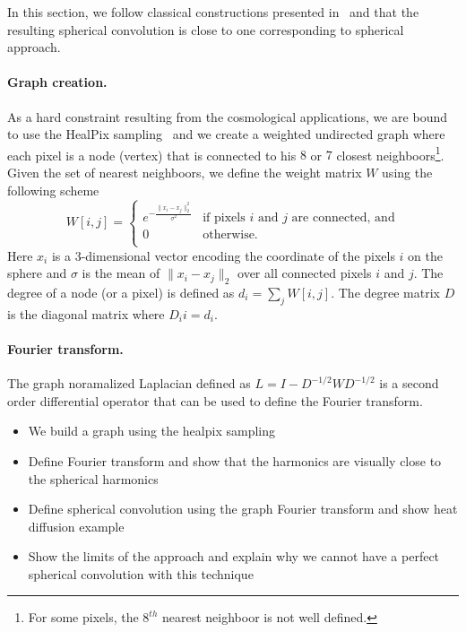 \documentclass[preprint,12pt,authoryear]{elsarticle}
\newcommand{\nati}[1]{{\color[rgb]{.1,.6,.1}{#1}}}
\begin{document}
In this section, we follow classical constructions presented in~\cite{cohen2018spherical,...} and \nati{show} that the resulting spherical convolution is close to one corresponding to spherical approach.

\paragraph{Graph creation.}
As a hard constraint resulting from the cosmological applications, we are bound to use the HealPix sampling~\cite{gorski2005healpix} and we create a weighted undirected graph where each pixel is a node (vertex) that is connected to his $8$ or $7$ closest neighboors\footnote{For some pixels, the $8^{th}$ nearest neighboor is not well defined.}. Given the set of nearest neighboors, we define the weight matrix $W$ using the following scheme
\begin{equation}
W[i,j]=\begin{cases}
e^{-\frac{\|x_i-x_j\|_2^2}{\sigma^2}} & \text{if pixels $i$ and $j$ are connected, and}\\
0 & \text{otherwise.}\\
\end{cases}
\end{equation}
Here $x_i$ is a 3-dimensional vector encoding the coordinate of the pixels $i$ on the sphere and $\sigma$ is the mean of $\|x_i-x_j\|_2$ over all connected pixels $i$ and $j$. The degree of a node (or a pixel) is defined as $d_i = \sum_j W[i,j]$. The degree matrix $D$ is the diagonal matrix where $D_ii=d_i$.

\paragraph{Fourier transform.}
The graph noramalized Laplacian defined as $L = I - D^{-1/2} W D^{-1/2}$ is a second order differential operator that can be used to define the Fourier transform.
 
\begin{itemize}
	\item We build a graph using the healpix sampling
	\item Define Fourier transform and show that the harmonics are visually close to the spherical harmonics
	\item Define spherical convolution using the graph Fourier transform and show heat diffusion example
	\item Show the limits of the approach and explain why we cannot have a perfect spherical convolution with this technique
\end{itemize}
\end{document}
